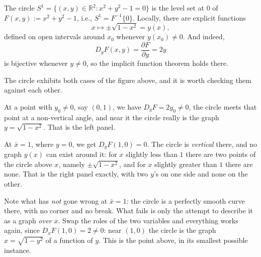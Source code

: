 \begin{example}
The circle $S^1 = \{(x,y) \in \mathbb{R}^2 : x^2+y^2-1=0\}$ is the level set at $0$ of
$F(x,y) := x^2+y^2-1$, i.e., $S^1 = F^{-1}\{0\}$. Locally, there are explicit functions
\[x \mapsto \pm\sqrt{1-x^2} = y(x),\]
defined on open intervals around $x_0$ whenever $y(x_0)\neq0$. And indeed,
\[D_yF(x,y) = \frac{\partial F}{\partial y} = 2y\]
is bijective whenever $y \neq 0$, so the implicit function theorem holds there.

\begin{remark}
The circle exhibits both cases of the figure above, and it is worth checking them against each
other.

At a point with $y_0 \neq 0$, say $(0,1)$, we have $D_yF = 2y_0 \neq 0$, the circle meets that
point at a non-vertical angle, and near it the circle really is the graph $y = \sqrt{1-x^2}$.
That is the left panel.

At $\bar x = 1$, where $y = 0$, we get $D_yF(1,0) = 0$. The circle is \emph{vertical} there, and
no graph $y(x)$ can exist around it: for $x$ slightly less than $1$ there are two points of the
circle above $x$, namely $\pm\sqrt{1-x^2}$, and for $x$ slightly greater than $1$ there are none.
That is the right panel exactly, with two $y$'s on one side and none on the other.

Note what has \emph{not} gone wrong at $\bar x = 1$: the circle is a perfectly smooth curve
there, with no corner and no break. What fails is only the attempt to describe it as a graph
\emph{over $x$}. Swap the roles of the two variables and everything works again, since
$D_xF(1,0) = 2 \neq 0$: near $(1,0)$ the circle is the graph $x = \sqrt{1-y^2}$ of a function
of $y$. This is the  point above, in its
smallest possible instance.
\end{remark}
\end{example}

